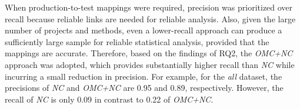 When production-to-test mappings were required, precision was prioritized over recall because reliable links are needed for reliable analysis. Also, given the large number of projects and methods, even a lower-recall approach can produce a sufficiently large sample for reliable statistical analysis, provided that the mappings are accurate. Therefore, based on the findings of RQ2, the \emph{OMC+NC} approach was adopted, which provides substantially higher recall than \emph{NC} while incurring a small reduction in precision. For example, for the \emph{all} dataset, the precisions of \emph{NC} and \emph{OMC+NC} are 0.95 and 0.89, respectively. However, the recall of \emph{NC} is only 0.09 in contrast to 0.22 of \emph{OMC+NC}.






